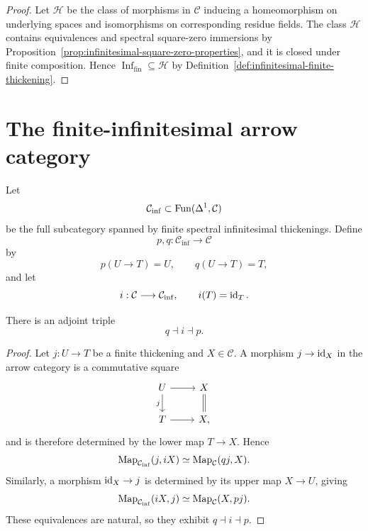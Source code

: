 \begin{proof}
Let \(\mathcal H\) be the class of morphisms in \(\mathcal C\) inducing a
homeomorphism on underlying spaces and isomorphisms on corresponding residue
fields.  The class \(\mathcal H\) contains equivalences and spectral
square-zero immersions by
Proposition~\ref{prop:infinitesimal-square-zero-properties}, and it is closed
under finite composition.  Hence
\(\operatorname{Inf}_{\mathrm{fin}}\subseteq\mathcal H\) by
Definition~\ref{def:infinitesimal-finite-thickening}.
\end{proof}

\section{The finite-infinitesimal arrow category}
\label{sec:infinitesimal-arrow-category}

\begin{definition}
\label{def:infinitesimal-arrow-category}
Let
\[
    \mathcal C_{\mathrm{inf}}
    \subset
    \operatorname{Fun}(\Delta^1,\mathcal C)
\]
be the full subcategory spanned by finite spectral infinitesimal thickenings.
Define
\[
    p,q:\mathcal C_{\mathrm{inf}}\longrightarrow\mathcal C
\]
by
\[
    p(U\to T)=U,
    \qquad
    q(U\to T)=T,
\]
and let
\[
    i:\mathcal C\longrightarrow\mathcal C_{\mathrm{inf}},
    \qquad
    i(T)=\operatorname{id}_T.
\]
\end{definition}

\begin{proposition}
\label{prop:infinitesimal-endpoint-adjunctions}
There is an adjoint triple
\[
    \boxed{
    q\dashv i\dashv p.
    }
\]
\end{proposition}

\begin{proof}
Let $j:U\to T$ be a finite thickening and $X\in\mathcal C$.  A morphism
$j\to\operatorname{id}_X$ in the arrow category is a commutative square
\[
\begin{tikzcd}
    U \ar[r] \ar[d,"j"'] & X \ar[d,equal]\\
    T \ar[r] & X,
\end{tikzcd}
\]
and is therefore determined by the lower map $T\to X$.  Hence
\[
    \operatorname{Map}_{\mathcal C_{\mathrm{inf}}}(j,iX)
    \simeq
    \operatorname{Map}_{\mathcal C}(qj,X).
\]
Similarly, a morphism $\operatorname{id}_X\to j$ is determined by its upper map $X\to U$,
giving
\[
    \operatorname{Map}_{\mathcal C_{\mathrm{inf}}}(iX,j)
    \simeq
    \operatorname{Map}_{\mathcal C}(X,pj).
\]
These equivalences are natural, so they exhibit $q\dashv i\dashv p$.
\end{proof}

